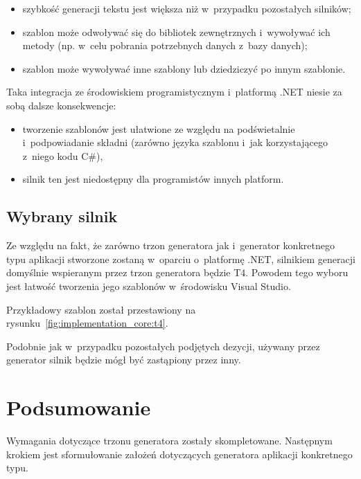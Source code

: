\begin{itemize}
 \item szybkość generacji tekstu jest większa niż w~przypadku pozostałych silników;
 \item szablon może odwoływać się do bibliotek zewnętrznych i~wywoływać ich metody (np. w~celu pobrania potrzebnych danych z~bazy danych);
 \item szablon może wywoływać inne szablony lub dziedziczyć po innym szablonie.
\end{itemize}

Taka integracja ze środowiskiem programistycznym i~platformą .NET niesie za sobą dalsze konsekwencje:

\begin{itemize}
 \item tworzenie szablonów jest ułatwione ze względu na podświetalnie i~podpowiadanie składni (zarówno języka szablonu i~jak korzystającego z~niego kodu C\#),
 \item silnik ten jest niedostępny dla programistów innych platform.
\end{itemize}


\subsection{Wybrany silnik}

Ze względu na fakt, że zarówno trzon generatora jak i~generator konkretnego typu aplikacji stworzone zostaną w~oparciu o~platformę .NET, silnikiem generacji domyślnie wspieranym przez trzon generatora będzie T4.
Powodem tego wyboru jest łatwość tworzenia jego szablonów w~środowisku Visual Studio.

Przykładowy szablon został przestawiony na rysunku~\ref{fig:implementation_core:t4}.



Podobnie jak w~przypadku pozostałych podjętych dezycji, używany przez generator silnik będzie mógł być zastąpiony przez inny.



\section{Podsumowanie}

Wymagania dotyczące trzonu generatora zostały skompletowane.
Następnym krokiem jest sformułowanie założeń dotyczących generatora aplikacji konkretnego typu.
